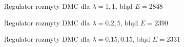 \begin{figure}[H]
\centering

\caption{Regulator rozmyty DMC dla $\lambda = {1, 1}$, błąd $E=2848$}
\label{R10}
\end{figure}

\begin{figure}[H]
\centering

\caption{Regulator rozmyty DMC dla $\lambda = {\num{0,2}, 5}$, błąd $E=2390$}
\label{R11}
\end{figure}

\begin{figure}[H]
\centering

\caption{Regulator rozmyty DMC dla $\lambda = {\num{0.15}, \num{0.15}}$, błąd $E=2331$}
\label{R12}
\end{figure}


